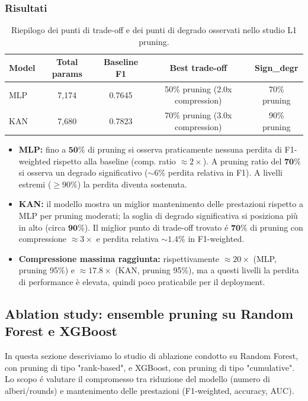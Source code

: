 \documentclass[a4paper,12pt]{report}
\begin{document}
	\subsubsection{Risultati}
	\begin{table}[H]
		\centering
		\setlength{\tabcolsep}{4pt}
		\begin{tabular}{lcccc}
			\toprule
			\textbf{Model} & \textbf{Total params} & \textbf{Baseline F1} & \textbf{Best trade-off} & \textbf{Sign\_degr} \\
			\midrule
			MLP & 7,174   & 0.7645 & 50\% pruning (2.0x compression) & 70\% pruning \\
			KAN & 7,680   & 0.7823 & 70\% pruning (3.0x compression) & 90\% pruning \\
			\bottomrule
		\end{tabular}
		\caption{Riepilogo dei punti di trade-off e dei punti di degrado osservati nello studio L1 pruning.}
	\end{table}
	\begin{itemize}
		\item \textbf{MLP:} fino a \(\mathbf{50\%}\) di pruning si osserva praticamente nessuna perdita di F1-weighted rispetto alla baseline (comp. ratio \(\approx 2\times\)). A pruning ratio del \(\mathbf{70\%}\) si osserva un degrado significativo (\(\sim 6\%\) perdita relativa in F1). A livelli estremi (\(\ge 90\%\)) la perdita diventa sostenuta.
		\item \textbf{KAN:} il modello mostra un miglior mantenimento delle prestazioni rispetto a MLP per pruning moderati; la soglia di degrado significativa si posiziona più in alto (circa \(\mathbf{90\%}\)). Il miglior punto di trade-off trovato é \(\mathbf{70\%}\) di pruning con compressione \(\approx 3\times\) e perdita relativa \(\sim 1.4\%\) in F1-weighted.
		\item \textbf{Compressione massima raggiunta:} rispettivamente \(\approx 20\times\) (MLP, pruning 95\%) e \(\approx 17.8\times\) (KAN, pruning 95\%), ma a questi livelli la perdita di performance \`e elevata, quindi poco praticabile per il deployment.
	\end{itemize}
	
	\subsection{Ablation study: ensemble pruning su Random Forest e XGBoost}
	
	In questa sezione descriviamo lo studio di ablazione condotto su Random Forest, con pruning di tipo "rank-based", e XGBoost, con pruning di tipo "cumulative". Lo scopo é valutare il compromesso tra riduzione del modello (numero di alberi/rounds) e mantenimento delle prestazioni (F1-weighted, accuracy, AUC).
	
\end{document}
